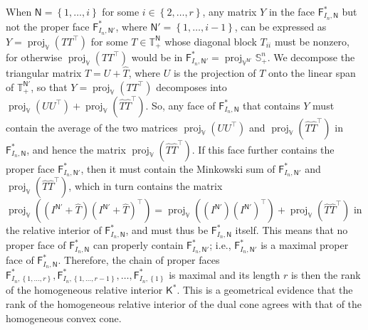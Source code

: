 \documentclass[oneside]{amsart}
\theoremstyle{plain}
\theoremstyle{definition}
\theoremstyle{remark}
\numberwithin{equation}{section}
\DeclareMathOperator{\proj}{proj}
\begin{document}
When $\mathsf{N} = \left\{1, \dotsc, i\right\}$ for some $i \in \left\{2,
\dotsc, r\right\}$, any matrix $Y$ in the face
$\mathsf{F}^{*}_{I_{n},\mathsf{N}}$ but not the proper face
$\mathsf{F}^{*}_{I_{n},\mathsf{N}'}$, where $\mathsf{N}' = \left\{1,
\dotsc, i-1\right\}$, can be expressed as $Y = \proj_{\mathbb{V}}\left( T
T^{\top} \right)$ for some $T \in \mathbb{T}_{+}^{\mathsf{N}}$ whose
diagonal block $T_{ii}$ must be nonzero, for otherwise
$\proj_{\mathbb{V}}\left( T T^{\top} \right)$ would be in
$\mathsf{F}^{*}_{I_{n},\mathsf{N}'} = \proj_{\mathbb{V}^{\mathsf{N}'}}
\mathbb{S}^{n}_{+}$. We decompose the triangular matrix $T = U + \hat{T}$,
where $U$ is the projection of $T$ onto the linear span of
$\mathbb{T}_{+}^{\mathsf{N}'}$, so that $Y = \proj_{\mathbb{V}}\left( T
T^{\top} \right)$ decomposes into $\proj_{\mathbb{V}}\left( U U^{\top}
\right) + \proj_{\mathbb{V}}\left( \hat{T} \hat{T}^{\top} \right)$. So, any
face of $\mathsf{F}^{*}_{I_{n},\mathsf{N}}$ that contains $Y$ must contain
the average of the two matrices $\proj_{\mathbb{V}}\left( U U^{\top}
\right)$ and $\proj_{\mathbb{V}}\left( \hat{T} \hat{T}^{\top} \right)$ in
$\mathsf{F}^{*}_{I_{n},\mathsf{N}}$, and hence the matrix
$\proj_{\mathbb{V}}\left( \hat{T} \hat{T}^{\top} \right)$. If this face
further contains the proper face $\mathsf{F}^{*}_{I_{n},\mathsf{N}'}$, then
it must contain the Minkowski sum of $\mathsf{F}^{*}_{I_{n},\mathsf{N}'}$
and $\proj_{\mathbb{V}}\left( \hat{T} \hat{T}^{\top} \right)$, which in
turn contains the matrix $\proj_{\mathbb{V}}\left( (I^{\mathsf{N}'} +
\hat{T}) (I^{\mathsf{N}'} + \hat{T})^{\top} \right) =
\proj_{\mathbb{V}}\left( (I^{\mathsf{N}'}) (I^{\mathsf{N}'})^{\top} \right)
+ \proj_{\mathbb{V}}\left( \hat{T} \hat{T}^{\top} \right)$ in the relative
interior of $\mathsf{F}^{*}_{I_{n},\mathsf{N}}$, and must thus be
$\mathsf{F}^{*}_{I_{n},\mathsf{N}}$ itself. This means that no proper face
of $\mathsf{F}^{*}_{I_{n},\mathsf{N}}$ can properly contain
$\mathsf{F}^{*}_{I_{n},\mathsf{N}'}$; i.e.,
$\mathsf{F}^{*}_{I_{n},\mathsf{N}'}$ is a maximal proper face of
$\mathsf{F}^{*}_{I_{n},\mathsf{N}}$. Therefore, the chain of proper faces
$\mathsf{F}^{*}_{I_{n},\left\{1, \dotsc, r\right\}},
\mathsf{F}^{*}_{I_{n},\left\{1, \dotsc, r-1\right\}}, \dotsc,
\mathsf{F}^{*}_{I_{n},\left\{1\right\}}$ is maximal and its length $r$ is
then the rank of the homogeneous relative interior $\mathsf{K}^{*}$. This
is a geometrical evidence that the rank of the homogeneous relative
interior of the dual cone agrees with that of the homogeneous convex cone.
\end{document}
